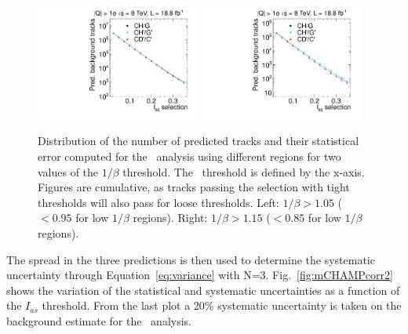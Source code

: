 \begin{figure}%
 \begin{center}
 \includegraphics[clip=false, trim=0.0cm 0cm 0.0cm 0cm, width=0.48\textwidth]{figures/multi/Data8TeVCollisionPrediction_TOF105}
 \includegraphics[clip=false, trim=0.0cm 0cm 0.0cm 0cm, width=0.48\textwidth]{figures/multi/Data8TeVCollisionPrediction_TOF115}
 \end{center}
 \caption[Distribution of the number of predicted tracks from different predictions in the \multi\ analysis]
{Distribution of the number of predicted tracks and their
   statistical error computed for the \multi\ analysis using
   different regions for two values of the $1/\beta$ threshold. The \ias\ threshold is defined by the x-axis.
Figures are cumulative, as tracks passing the selection with tight thresholds will also pass for loose thresholds.
Left: $1/\beta>1.05$ ($<0.95$ for low $1/\beta$ regions). Right: $1/\beta>1.15$ ($<0.85$ for low $1/\beta$ regions).}
 \label{fig:mCHAMPcorr}
\end{figure}

The spread in the three predictions is then used to determine the systematic uncertainty through Equation~\ref{eq:variance} with N=3.
Fig.~\ref{fig:mCHAMPcorr2} shows the variation of the statistical and systematic uncertainties as a function of the $I_{as}$ threshold.
From the last plot a 20\% systematic uncertainty is taken on the background estimate for the \multi\ analysis.

